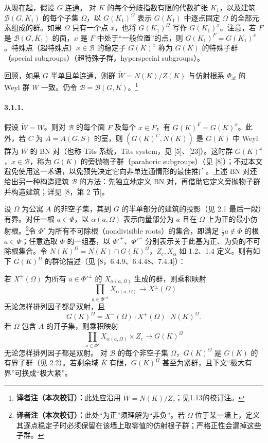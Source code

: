 从现在起，假设 $G$ 连通。
对 $K$ 的每个分歧指数有限的代数扩张 $K_1$，以及建筑 $\mathscr B(G,K_1)$ 的每个子集 $\Omega$，以 $G(K_1)^\Omega$ 表示 $G(K_1)$ 中逐点固定 $\Omega$ 的全部元素组成的群。如果 $\Omega$ 只有一个点 $x$，也将 $G(K_1)^\Omega$ 写作 $G(K_1)^x$。注意，若 $F$ 是 $\mathscr B(G,K_1)$ 的面，$x$ 是 $F$ 中处于“一般位置”的点，则 $G(K_1)^F=G(K_1)^x$。特殊点（超特殊点）$x\in\mathscr B$ 的稳定子 $G(K)^x$ 称为 $G(K)$ 的特殊子群（special subgroups）（超特殊子群，hyperspecial subgroups）。

回顾，如果 $G$ 半单且单连通，则群 $\widetilde W=N(K)/Z(K)$ 与仿射根系 $\Phi_{\mathrm{af}}$ 的 Weyl 群 $W$ 一致。仍令 $\mathscr B=\mathscr B(G,K)$。\footnote{\textbf{译者注（本次校订）：}此处应沿用 $\widetilde W=N(K)/Z_c$；见1.13的校订注。}

\paragraph*{3.1.1.}假设 $\widetilde W=W$。则对 $\mathscr B$ 的每个面 $F$ 及每个 $x\in F$，有 $G(K)^F=G(K)^x$。此外，若 $C$ 为 $A=A(G,S)$ 的室，则 $(G(K)^C,N(K))$ 是 $G(K)$ 中 Weyl 群为 $W$ 的 BN 对（也称 Tits 系统，Tits system，见 [5]、[23]）。这时群 $G(K)^x$，$x\in\mathscr B$，称为 $G(K)$ 的旁抛物子群（parahoric subgroups）（见 [8]）；不过本文避免使用这一术语，以免预先决定它向非单连通情形的最佳推广。上述 BN 对还给出另一种构造建筑 $\mathscr B$ 的方法：先独立地定义 BN 对，再借助它定义旁抛物子群并构造建筑；详见 [8，第 2 节]。

设 $\Omega$ 为公寓 $A$ 的非空子集，其到 $G$ 的半单部分的建筑的投影（见 2.1 最后一段）有界。对任一根 $a\in\Phi$，以 $\alpha(a,\Omega)$ 表示向量部分为 $a$ 且在 $\Omega$ 上为正的最小仿射根。\footnote{\textbf{译者注（本次校订）：}此处“为正”须理解为“非负”。若 $\Omega$ 位于某一墙上，定义其逐点稳定子时必须保留在该墙上取零值的仿射根子群；严格正性会漏掉这些子群。}令 $\Phi'$ 为所有不可除根（nondivisible roots）的集合，即满足 $\frac12a\notin\Phi$ 的根 $a\in\Phi$；任意选取 $\Phi$ 的一组基，以 $\Phi'^+$、$\Phi'^-$ 分别表示关于此基为正、为负的不可除根集合。令 $N(K)^\Omega=N(K)\cap G(K)^\Omega$，$Z_c,X_\alpha$ 如 1.2、1.4 定义。则有如下 $G(K)^\Omega$ 的群论描述（见 [8，6.4.9、6.4.48、7.4.4]）：

若 $X^\pm(\Omega)$ 为所有 $a\in\Phi'^\pm$ 的 $X_{\alpha(a,\Omega)}$ 生成的群，则乘积映射
\[
\prod_{a\in\Phi'^\pm}X_{\alpha(a,\Omega)}\longrightarrow X^\pm(\Omega)
\]
无论怎样排列因子都是双射，且
\[
G(K)^\Omega=X^-(\Omega)\cdot X^+(\Omega)\cdot N(K)^\Omega.
\]
若 $\Omega$ 包含 $A$ 的开子集，则乘积映射
\[
\prod_{a\in\Phi'}X_{\alpha(a,\Omega)}\times Z_c\longrightarrow G(K)^\Omega
\]
无论怎样排列因子都是双射。
对 $\mathscr B$ 的每个非空子集 $\Omega$，$G(K)^\Omega$ 是 $G(K)$ 的有界子群（见 2.2）。若剩余域 $\overline K$ 有限，$G(K)^\Omega$ 甚至为紧群，且下文“极大有界”可换成“极大紧”。

